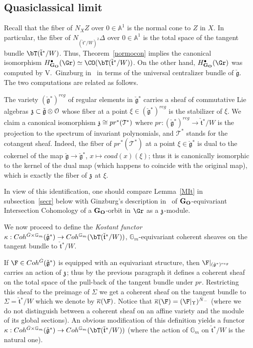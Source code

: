 \documentclass[11pt]{amsart}
\theoremstyle{definition}
\theoremstyle{remark}
\renewcommand{\O}{{\mathcal O}}
\theoremstyle{remark}
\newcommand{\cal}{\mathcal}
\newcommand{\<}{\langle}
\renewcommand{\>}{\rangle}
\newcommand{\z}{{\frak z}}
\newcommand{\Lg}{\check{\mathfrak g}{}}
\newcommand{\Lt}{\check{\mathfrak t}{}}
\newcommand{\LN}{\check{N}{}}
\newcommand{\LG}{{\check{G}}}
\renewcommand{\O}{{\cal O}}
\newcommand{\cT}{{\cal T}}
\newcommand{\GO}{{\bf G_O}}
\newcommand{\Aone}{{\mathbb A}^1}
\newcommand{\Gm}{{{\mathbb G}_m}}
\begin{document}
\subsection{Quasiclassical limit}
\label{quasic}
Recall that the fiber of $N_XZ$ over $0\in\Aone$ is the normal cone to $Z$
in $X$. In particular, the fiber of $N_{(\Lt^*/W)^2}\Delta$ over
$0\in\Aone$ is the total space of the tangent bundle $\bT(\Lt^*/W)$.
Thus, Theorem~\ref{normocon} implies the canonical isomorphism
$H^\bullet_\GO(\Gr)\simeq\CO(\bT(\Lt^*/W))$. On the other hand, 
$H^\bullet_\GO(\Gr)$ was computed by V.~Ginzburg in~\cite{G} in terms of
the universal centralizer bundle of $\Lg$. The two computations are related
as follows. 

The variety $(\Lg^*)^{reg} $ of regular elements in $\Lg^*$
carries a sheaf of commutative Lie algebras $\z \subset \Lg\otimes
\O$ whose fiber at a point $\xi\in (\Lg^*)^{reg}$ is the
stabilizer of $\xi$. We claim a canonical isomorphism $\z\cong
pr^*(\cT^*)$ where $pr:(\Lg^*)^{reg} \to \Lt^*/W$ is the
projection to the spectrum of invariant polynomials, and $\cT^*$
stands for the cotangent sheaf. Indeed, the fiber of $pr^*(\cT^*)$
at a point $\xi\in \Lg^*$ is dual to  the cokernel of the map $\Lg \to
\Lg^*$, $x\mapsto coad(x)(\xi)$; thus it is canonically isomorphic
to the kernel of the dual map (which happens to coincide with the
original map), which is exactly the fiber of $\z$ at $\xi$.

In view of this identification, one should compare Lemma~\ref{MIt}
in subsection~\ref{secr} below with Ginzburg's description in~\cite{G}
of $\GO$-equivariant Intersection Cohomology
of a $\GO$-orbit in $\Gr$ as a $\z$-module.

We now proceed to
define the {\em Kostant functor} $\kappa: Coh^{\LG\times\Gm}(\Lg^*)\to Coh^\Gm
(\bT(\Lt^*/W))$, $\Gm$-equivariant coherent sheaves on the tangent bundle to
$\Lt^*/W$.

 If $\F \in Coh^\LG(\Lg^*)$ is equipped with
an equivariant structure, then $\F|_{(\Lg^*)^{reg} }$ carries an
action of $\z$; thus by the previous paragraph it defines a
coherent sheaf on the total space of the pull-back of the tangent
bundle under $pr$. Restricting this sheaf to the preimage of
$\Sigma$ we get a coherent sheaf on the tangent bundle to
$\Sigma=\Lt^*/W$ which we denote by $\overline{\kappa}(\F)$. Notice that
$\overline{\kappa}(\F)= (\F|_{\Upsilon})^{\LN_-}$ (where we do not distinguish
between a coherent sheaf on an affine variety and the module of
its global sections). An obvious modification of this definition
yields a functor $\kappa: Coh^{\LG\times \Gm}(\Lg^*)\to Coh^{\Gm}
(\bT(\Lt^*/W))$ (where the action of $\Gm$ on $\Lt^*/W$ is the natural one).
\end{document}
